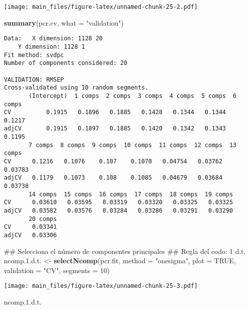 \documentclass[]{article}
\newenvironment{Shaded}{\begin{snugshade}}{\end{snugshade}}
\newcommand{\KeywordTok}[1]{\textcolor[rgb]{0.13,0.29,0.53}{\textbf{#1}}}
\newcommand{\DataTypeTok}[1]{\textcolor[rgb]{0.13,0.29,0.53}{#1}}
\newcommand{\DecValTok}[1]{\textcolor[rgb]{0.00,0.00,0.81}{#1}}
\newcommand{\FloatTok}[1]{\textcolor[rgb]{0.00,0.00,0.81}{#1}}
\newcommand{\StringTok}[1]{\textcolor[rgb]{0.31,0.60,0.02}{#1}}
\newcommand{\OtherTok}[1]{\textcolor[rgb]{0.56,0.35,0.01}{#1}}
\newcommand{\NormalTok}[1]{#1}
\begin{document}
\texttt{[image: main\_files/figure-latex/unnamed-chunk-25-2.pdf]}

\begin{Shaded}
\begin{Highlighting}[]
\KeywordTok{summary}\NormalTok{(pcr.cv, }\DataTypeTok{what =} \StringTok{"validation"}\NormalTok{)}
\end{Highlighting}
\end{Shaded}

\begin{verbatim}
Data:   X dimension: 1128 20 
    Y dimension: 1128 1
Fit method: svdpc
Number of components considered: 20

VALIDATION: RMSEP
Cross-validated using 10 random segments.
       (Intercept)  1 comps  2 comps  3 comps  4 comps  5 comps  6 comps
CV          0.1915   0.1896   0.1885   0.1428   0.1344   0.1344   0.1217
adjCV       0.1915   0.1897   0.1885   0.1420   0.1342   0.1343   0.1195
       7 comps  8 comps  9 comps  10 comps  11 comps  12 comps  13 comps
CV      0.1216   0.1076    0.107    0.1070   0.04754   0.03762   0.03783
adjCV   0.1179   0.1073    0.108    0.1085   0.04679   0.03684   0.03738
       14 comps  15 comps  16 comps  17 comps  18 comps  19 comps
CV      0.03610   0.03595   0.03319   0.03320   0.03325   0.03325
adjCV   0.03582   0.03576   0.03284   0.03286   0.03291   0.03290
       20 comps
CV      0.03341
adjCV   0.03306
\end{verbatim}

\begin{Shaded}
\begin{Highlighting}[]
\NormalTok{## Selecciona el número de componentes principales}
\NormalTok{## Regla del codo: 1 d.t.}
\NormalTok{ncomp.}\FloatTok{1.}\NormalTok{d.t. <-}\StringTok{ }\KeywordTok{selectNcomp}\NormalTok{(pcr.fit, }\DataTypeTok{method =} \StringTok{"onesigma"}\NormalTok{, }\DataTypeTok{plot =} \OtherTok{TRUE}\NormalTok{, }\DataTypeTok{validation =} \StringTok{"CV"}\NormalTok{,}
                            \DataTypeTok{segments =} \DecValTok{10}\NormalTok{)}
\end{Highlighting}
\end{Shaded}

\texttt{[image: main\_files/figure-latex/unnamed-chunk-25-3.pdf]}

\begin{Shaded}
\begin{Highlighting}[]
\NormalTok{ncomp.}\FloatTok{1.}\NormalTok{d.t.}
\end{Highlighting}
\end{Shaded}
\end{document}
